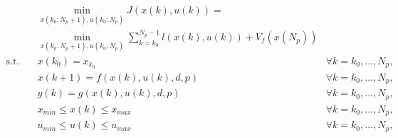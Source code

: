 \begin{equation}
	\begin{aligned}
		& \min_{x(k_0:N_p+1),u(k_0:N_p)} J(x(k),u(k)) = \\ 
		& \min_{x(k_0:N_p+1),u(k_0:N_p)} \sum_{k=k_0}^{N_p-1} l(x(k),u(k)) + V_f(x(N_p))  \\
		\text{s.t.} \quad  & x(k_0) = x_{k_0}                              & \forall k = k_0,\hdots, N_p,\\
		& x(k+1) = f(x(k),u(k),d, p)       & \forall k = k_0,\hdots, N_p,\\
		& y(k) = g(x(k),u(k),d,p)                 & \forall k = k_0,\hdots, N_p,\\
		& x_{min} \leq x(k) \leq x_{max}                  & \forall k = k_0,\hdots, N_p,\\
		& u_{min} \leq u(k) \leq u_{max}                  & \forall k = k_0,\hdots, N_p,\\
	\end{aligned}
	\label{eq:mcp ocp}
\end{equation}

